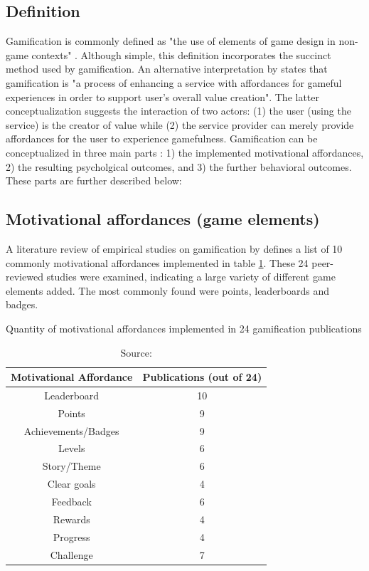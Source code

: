 \subsection{Definition}

Gamification is commonly defined as "the use of elements of game design in non-game contexts" \cite{deterding2011game}. Although simple, this definition incorporates the succinct method used by gamification. An alternative interpretation by \cite{huotari2012defining} states that gamification is "a process of enhancing a service with affordances for gameful experiences in order to support user's overall value creation". The latter conceptualization suggests the interaction of two actors: (1) the user (using the service) is the creator of value while (2) the service provider can merely provide affordances for the user to experience gamefulness. Gamification can be conceptualized in three main parts \cite{hamari2014does}: 1) the implemented motivational affordances, 2) the resulting psycholgical outcomes, and 3) the further behavioral outcomes. These parts are further described below: 

\subsection{Motivational affordances (game elements)}

A literature review of empirical studies on gamification by \cite{hamari2014does} defines a list of 10 commonly motivational affordances implemented in table \ref{tab:motivational-affordances}. These 24 peer-reviewed studies were examined, indicating a large variety of different game elements added. The most commonly found were points, leaderboards and badges.

\begin{table}[ht]
    \centering
    \caption{Quantity of motivational affordances implemented in 24 gamification publications}
    \begin{tabular}{|c|c|}
        \hline Motivational Affordance & Publications (out of 24) \\
        \hline Leaderboard & 10\\ 
        \hline Points & 9 \\
        \hline Achievements/Badges & 9 \\
        \hline Levels & 6 \\
        \hline Story/Theme & 6 \\
        \hline Clear goals & 4 \\
        \hline Feedback & 6 \\
        \hline Rewards & 4 \\
        \hline Progress & 4 \\
        \hline Challenge & 7 \\
        \hline
    \end{tabular}
    \caption*{Source: \cite{hamari2014does}}
    \label{tab:motivational-affordances}
\end{table}

